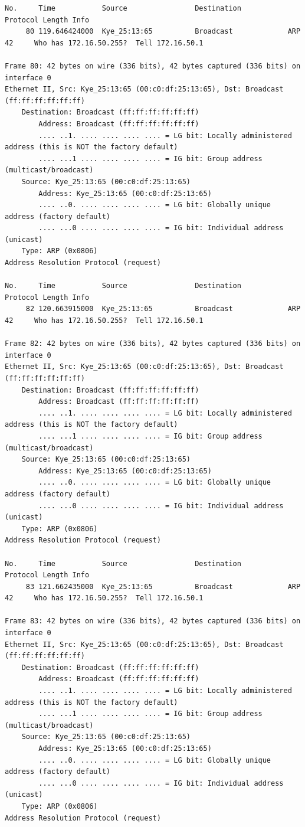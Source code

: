 \documentclass[a4paper,11pt]{article}
\begin{document}
\begin{lstlisting}
No.     Time           Source                Destination           Protocol Length Info
     80 119.646424000  Kye_25:13:65          Broadcast             ARP      42     Who has 172.16.50.255?  Tell 172.16.50.1

Frame 80: 42 bytes on wire (336 bits), 42 bytes captured (336 bits) on interface 0
Ethernet II, Src: Kye_25:13:65 (00:c0:df:25:13:65), Dst: Broadcast (ff:ff:ff:ff:ff:ff)
    Destination: Broadcast (ff:ff:ff:ff:ff:ff)
        Address: Broadcast (ff:ff:ff:ff:ff:ff)
        .... ..1. .... .... .... .... = LG bit: Locally administered address (this is NOT the factory default)
        .... ...1 .... .... .... .... = IG bit: Group address (multicast/broadcast)
    Source: Kye_25:13:65 (00:c0:df:25:13:65)
        Address: Kye_25:13:65 (00:c0:df:25:13:65)
        .... ..0. .... .... .... .... = LG bit: Globally unique address (factory default)
        .... ...0 .... .... .... .... = IG bit: Individual address (unicast)
    Type: ARP (0x0806)
Address Resolution Protocol (request)

No.     Time           Source                Destination           Protocol Length Info
     82 120.663915000  Kye_25:13:65          Broadcast             ARP      42     Who has 172.16.50.255?  Tell 172.16.50.1

Frame 82: 42 bytes on wire (336 bits), 42 bytes captured (336 bits) on interface 0
Ethernet II, Src: Kye_25:13:65 (00:c0:df:25:13:65), Dst: Broadcast (ff:ff:ff:ff:ff:ff)
    Destination: Broadcast (ff:ff:ff:ff:ff:ff)
        Address: Broadcast (ff:ff:ff:ff:ff:ff)
        .... ..1. .... .... .... .... = LG bit: Locally administered address (this is NOT the factory default)
        .... ...1 .... .... .... .... = IG bit: Group address (multicast/broadcast)
    Source: Kye_25:13:65 (00:c0:df:25:13:65)
        Address: Kye_25:13:65 (00:c0:df:25:13:65)
        .... ..0. .... .... .... .... = LG bit: Globally unique address (factory default)
        .... ...0 .... .... .... .... = IG bit: Individual address (unicast)
    Type: ARP (0x0806)
Address Resolution Protocol (request)

No.     Time           Source                Destination           Protocol Length Info
     83 121.662435000  Kye_25:13:65          Broadcast             ARP      42     Who has 172.16.50.255?  Tell 172.16.50.1

Frame 83: 42 bytes on wire (336 bits), 42 bytes captured (336 bits) on interface 0
Ethernet II, Src: Kye_25:13:65 (00:c0:df:25:13:65), Dst: Broadcast (ff:ff:ff:ff:ff:ff)
    Destination: Broadcast (ff:ff:ff:ff:ff:ff)
        Address: Broadcast (ff:ff:ff:ff:ff:ff)
        .... ..1. .... .... .... .... = LG bit: Locally administered address (this is NOT the factory default)
        .... ...1 .... .... .... .... = IG bit: Group address (multicast/broadcast)
    Source: Kye_25:13:65 (00:c0:df:25:13:65)
        Address: Kye_25:13:65 (00:c0:df:25:13:65)
        .... ..0. .... .... .... .... = LG bit: Globally unique address (factory default)
        .... ...0 .... .... .... .... = IG bit: Individual address (unicast)
    Type: ARP (0x0806)
Address Resolution Protocol (request)


\end{lstlisting}
\end{document}
